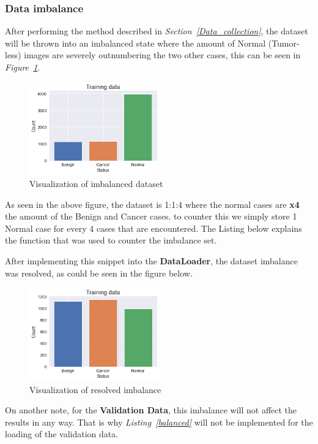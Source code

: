 \documentclass[12pt]{extarticle}
\begin{document}
	\subsubsection{Data imbalance}
	After performing the method described in \emph{Section~\ref{Data_collection}}, the dataset will be thrown into an imbalanced state where the amount of Normal (Tumor-less) images are severely outnumbering the two other cases, this can be seen in \emph{Figure~\ref{fig:imbalance}}.
	\begin{figure}[h]
		\centering
		\includegraphics[width=0.5\textwidth]{pics/Figures/Train_imbalance.png}
		\caption{\small{Visualization of imbalanced dataset}}
		\label{fig:imbalance}
	\end{figure}
	
	As seen in the above figure, the dataset is 1:1:4 where the normal cases are \textbf{x4} the amount of the Benign and Cancer cases.
	to counter this we simply store 1 Normal case for every 4 cases that are encountered. The Listing below explains the function that was used to counter the imbalance set.

	After implementing this snippet into the \textbf{DataLoader}, the dataset imbalance was resolved, as could be seen in the figure below.
	\begin{figure}[h]
		\centering
		\includegraphics[width=0.5\textwidth]{pics/Figures/Train_balance.png}
		\caption{\small{Visualization of resolved imbalance}}
		\label{fig:balance}
	\end{figure}
	On another note, for the \textbf{Validation Data}, this imbalance will not affect the results in any way. That is why \emph{Listing~\ref{balanced}} will not be implemented for the loading of the validation data.
	
\end{document}
